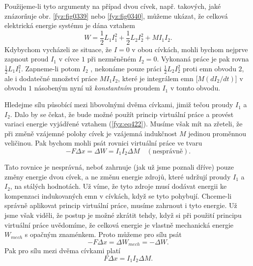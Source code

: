   Použijeme-li tyto argumenty na případ dvou cívek, např. takových, jaké znázorňuje obr. 
  \ref{fyz:fig0339} nebo \ref{fyz:fig0340}, můžeme ukázat, že celková elektrická energie systému je 
  dána vztahem
  \begin{equation}\label{fyz:eq422}
    W = \frac{1}{2}L_1I_1^2 + \frac{1}{2}L_2I_2^2 + MI_1I_2.
  \end{equation}
  Kdybychom vycházeli ze situace, že \(I = 0\) v obou cívkách, mohli bychom nejprve zapnout proud 
  \(I_1\) v cívce \(1\) při nezměněném \(I_2 = 0\). Vykonaná práce je pak rovna 
  \(\frac{1}{2}L_1I_1^2\). Zapneme-li potom \(I_2\) , nekonáme pouze práci \(\frac{1}{2}L_2I_2^2\) 
  proti emn obvodu \(2\), ale i dodatečné množství práce \(MI_1I_2\), které je integrálem emn 
  [\(M(dI_2/dt)\)] v obvodu \(1\) násobeným nyní už \emph{konstantním} proudem \(I_1\) v tomto 
  obvodu.
  
  Hledejme sílu působící mezi libovolnými dvěma cívkami, jimiž tečou proudy \(I_1\) a \(I_2\). Dalo 
  by se čekat, že bude možné použít princip virtuální práce a provést variaci energie vyjádřené 
  vztahem (\ref{fyz:eq422}). Musíme však mít na zřeteli, že při změně vzájemné polohy cívek je 
  vzájemná indukčnost \(M\) jedinou proměnnou veličinou. Pak bychom mohli psát rovnici virtuální 
  práce ve tvaru
  \begin{equation}\label{fyz:eq423}
    -F\Delta x = \Delta W = I_1I_2\Delta M \quad (\text{nesprávně}).
  \end{equation}

  Tato rovnice je nesprávná, neboť zahrnuje (jak už jsme poznali dříve) pouze změny energie dvou 
  cívek, a ne změnu energie zdrojů, které udržují proudy \(I_1\) a \(I_2\), na stálých hodnotách. 
  Už víme, že tyto zdroje musí dodávat energii ke kompenzaci indukovaných emn v cívkách, když se 
  tyto pohybují. Chceme-li správně aplikovat princip virtuální práce, musíme zahrnout i tyto 
  energie. Už jsme však viděli, že postup je možné zkrátit tehdy, když si při použití principu 
  virtuální práce uvědomíme, že celková energie je vlastně mechanická energie \(W_{mech}\) s 
  opačným znaménkem. Proto můžeme pro sílu psát
  \begin{equation}\label{fyz:eq424}
    -F\Delta x = \Delta W_{mech} = -\Delta W.
  \end{equation}
  Pak pro sílu mezi dvěma cívkami platí
  \begin{equation*}
    F\Delta x = I_1I_2\Delta M.
  \end{equation*}
  
